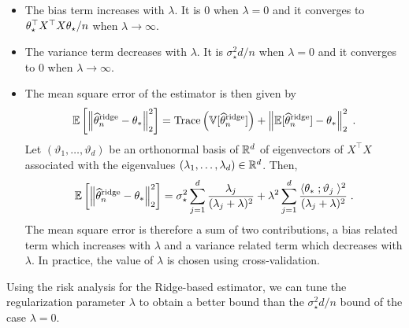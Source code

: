 \begin{remark}
\begin{itemize}
\item The bias term increases with $\lambda$. It is 0 when $\lambda = 0$ and it converges to $\theta_\star^\top X^\top X\theta_\star / n$ when $\lambda\to \infty$.
\item  The variance term decreases with $\lambda$. It is $\sigma_\star^2 d /n$ when $\lambda = 0$ and it converges to $0$ when $\lambda\to \infty$.
\item The mean square error of the estimator is then given by
\[
\mathbb{E}\left[\left\|\widehat {\theta}^{\mathrm{ridge}}_n-\theta_*\right\|_2^2\right] = \mathrm{Trace}\left(\mathbb{V}[\widehat {\theta}^{\mathrm{ridge}}_n]\right) + \left\|\mathbb{E}[\widehat {\theta}^{\mathrm{ridge}}_n] - \theta_*\right\|_2^2\;.
\]
Let $(\vartheta_1,\ldots,\vartheta_d)$ be an orthonormal basis of $\mathbb{R}^d$ of eigenvectors of $X^\top X$ associated with the eigenvalues $(\lambda_1,\ldots,\lambda_d)\in\mathbb{R}^d$. Then,
\[
\mathbb{E}\left[\left\|\widehat {\theta}^{\mathrm{ridge}}_n-\theta_*\right\|_2^2\right] =  \sigma_\star^2 \sum_{j=1}^d \frac{\lambda_j}{(\lambda_j+\lambda)^2} + \lambda^2  \sum_{j=1}^d \frac{\langle \theta_* \;; \vartheta_j\;\rangle^2}{(\lambda_j+\lambda)^2}\;.
\]
The mean square error is therefore a sum of two contributions, a bias related term which increases with $\lambda$ and a variance related term which decreases with $\lambda$. In practice, the value of $\lambda$ is chosen using cross-validation.
\end{itemize}
\end{remark}
Using the risk analysis for the Ridge-based estimator, we can tune the regularization parameter $\lambda$ to obtain
a  better bound than the $\sigma_\star^2 d /n$ bound of the case $\lambda = 0$.

